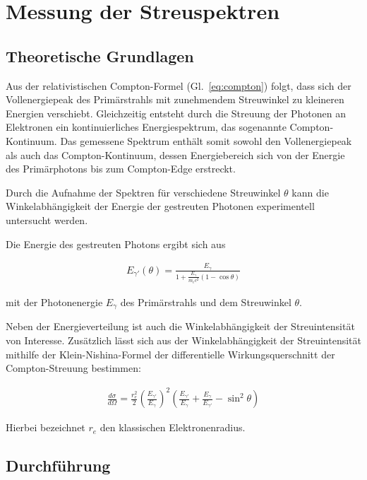 \chapter{Messung der Streuspektren}

\section{Theoretische Grundlagen}

Aus der relativistischen Compton-Formel (Gl.~\ref{eq:compton}) folgt, dass sich der Vollenergiepeak des Primärstrahls mit zunehmendem Streuwinkel zu kleineren Energien verschiebt. 
Gleichzeitig entsteht durch die Streuung der Photonen an Elektronen ein kontinuierliches Energiespektrum, das sogenannte Compton-Kontinuum. 
Das gemessene Spektrum enthält somit sowohl den Vollenergiepeak als auch das Compton-Kontinuum, dessen Energiebereich sich von der Energie des Primärphotons bis zum Compton-Edge erstreckt.

Durch die Aufnahme der Spektren für verschiedene Streuwinkel $\theta$ kann die Winkelabhängigkeit der Energie der gestreuten Photonen experimentell untersucht werden.

Die Energie des gestreuten Photons ergibt sich aus

\begin{align}
    E_{\gamma'}(\theta)
    =
    \frac{E_\gamma}
    {1+\frac{E_\gamma}{m_ec^2}(1-\cos\theta)}
    \label{eq:compton_fit}
\end{align}

mit der Photonenergie $E_\gamma$ des Primärstrahls und dem Streuwinkel $\theta$.

Neben der Energieverteilung ist auch die Winkelabhängigkeit der Streuintensität von Interesse. 
Zusätzlich lässt sich aus der Winkelabhängigkeit der Streuintensität mithilfe der Klein-Nishina-Formel \cite{KleinNishina1929} der differentielle Wirkungsquerschnitt der Compton-Streuung bestimmen:

\begin{align}
    \frac{d\sigma}{d\Omega} = \frac{r_e^2}{2} \left( \frac{E_{\gamma'}}{E_{\gamma}} \right)^2 \left( \frac{E_{\gamma'}}{E_{\gamma}} + \frac{E_{\gamma}}{E_{\gamma'}} - \sin^2 \theta \right)
    \label{form:KleinNishima}
\end{align}

Hierbei bezeichnet $r_e$ den klassischen Elektronenradius.

\section{Durchführung}

